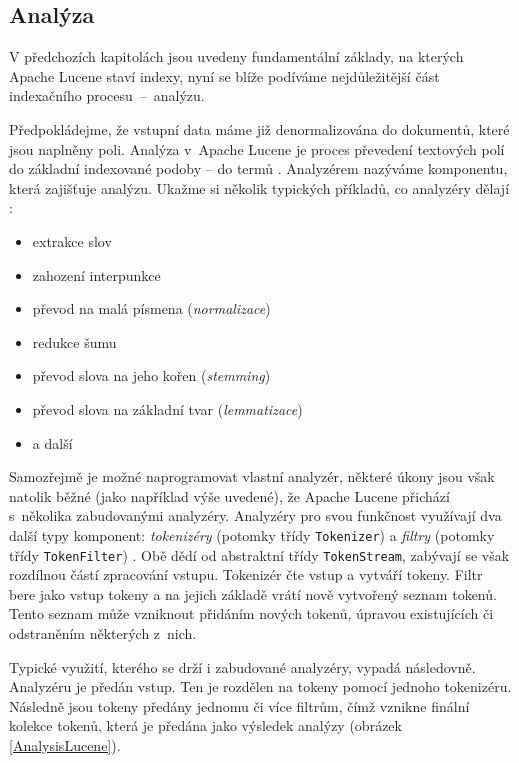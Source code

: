\documentclass[11pt,oneside]{fithesis2}
\begin{document}
\subsection{Analýza}
V předchozích kapitolách jsou uvedeny fundamentální základy, na kterých Apache Lucene staví indexy, nyní se blíže podíváme nejdůležitější část indexačního procesu~--~analýzu.

Předpokládejme, že vstupní data máme již denormalizována do dokumentů, které jsou naplněny poli. Analýza v~Apache Lucene je proces převedení textových polí do základní indexované podoby -- do termů \cite[s.~28]{LuceneAction}. Analyzérem nazýváme komponentu, která zajišťuje analýzu. Ukažme si několik typických příkladů, co analyzéry dělají  \cite[s.~110]{LuceneAction}:

\begin{itemize}
	\item extrakce slov
	\item zahození interpunkce
	\item převod na malá písmena (\emph{normalizace})
	\item redukce šumu
	\item převod slova na jeho kořen (\emph{stemming})
	\item převod slova na základní tvar (\emph{lemmatizace})
	\item a další 
\end{itemize}

Samozřejmě je možné naprogramovat vlastní analyzér, některé úkony jsou však natolik běžné (jako například výše uvedené), že Apache Lucene přichází s~několika zabudovanými analyzéry. Analyzéry pro svou funkčnost využívají dva další typy komponent: \emph{tokenizéry} (potomky třídy \texttt{Tokenizer}) a \emph{filtry} (potomky třídy \texttt{TokenFilter})  \cite[s.~115]{LuceneAction}. Obě dědí od abstraktní třídy \texttt{TokenStream}, zabývají se však rozdílnou částí zpracování vstupu. Tokenizér čte vstup a vytváří tokeny. Filtr bere jako vstup tokeny a na jejich základě vrátí nově vytvořený seznam tokenů. Tento seznam může vzniknout přidáním nových tokenů, úpravou existujících či odstraněním některých z~nich. 

Typické využití, kterého se drží i zabudované analyzéry, vypadá následovně. Analyzéru je předán vstup. Ten je rozdělen na tokeny pomocí jednoho tokenizéru. Následně jsou tokeny předány jednomu či více filtrům, čímž vznikne finální kolekce tokenů, která je předána jako výsledek analýzy (obrázek \ref{AnalysisLucene}).
\end{document}
